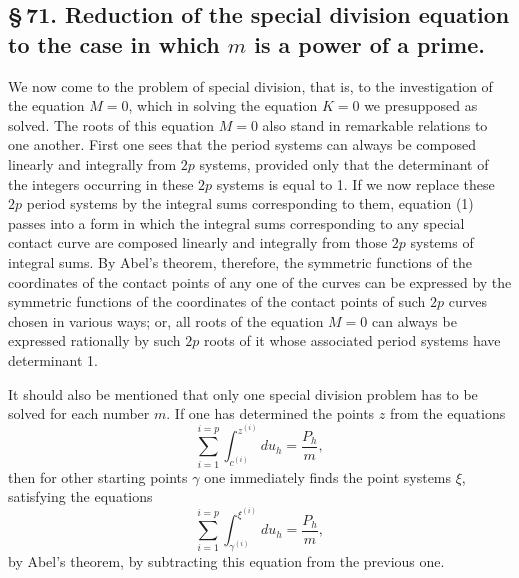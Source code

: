 \documentclass[10pt]{article}
\begin{document}
\subsection*{\S\,71. Reduction of the special division equation to the case in which \(m\) is a power of a prime.}

We now come to the problem of special division, that is, to the investigation of the equation \(M=0\), which in solving the equation \(K=0\) we presupposed as solved. The roots of this equation \(M=0\) also stand in remarkable relations to one another. First one sees that the period systems can always be composed linearly and integrally from \(2p\) systems, provided only that the determinant of the integers occurring in these \(2p\) systems is equal to 1. If we now replace these \(2p\) period systems by the integral sums corresponding to them, equation (1) passes into a form in which the integral sums corresponding to any special contact curve are composed linearly and integrally from those \(2p\) systems of integral sums. By Abel's theorem, therefore, the symmetric functions of the coordinates of the contact points of any one of the curves can be expressed by the symmetric functions of the coordinates of the contact points of such \(2p\) curves chosen in various ways; or, all roots of the equation \(M=0\) can always be expressed rationally by such \(2p\) roots of it whose associated period systems have determinant 1.

It should also be mentioned that only one special division problem has to be solved for each number \(m\). If one has determined the points \(z\) from the equations
\[
\sum_{i=1}^{i=p}\int_{c^{(i)}}^{z^{(i)}}du_h=\frac{P_h}{m},
\]
then for other starting points \(\gamma\) one immediately finds the point systems \(\xi\), satisfying the equations
\[
\sum_{i=1}^{i=p}\int_{\gamma^{(i)}}^{\xi^{(i)}}du_h=\frac{P_h}{m},
\]
by Abel's theorem, by subtracting this equation from the previous one.
\end{document}
